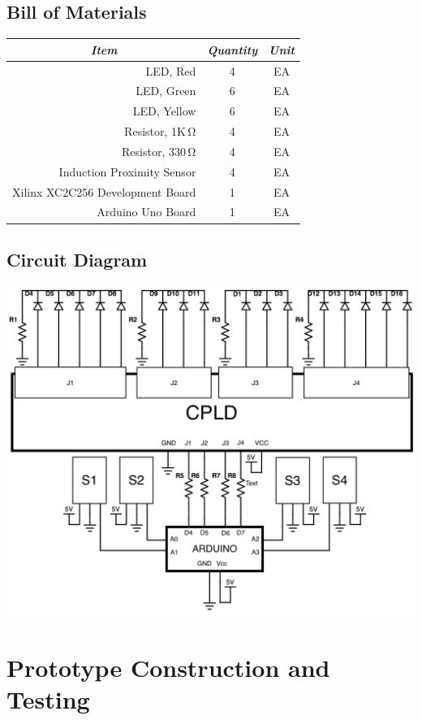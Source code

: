 \subsection{Bill of Materials}
\begin{table}[h]
\begin{tabular}{|r|c|c|}
\hline
\multicolumn{1}{|c|}{\textit{Item}} & \textit{Quantity} & \textit{Unit} \\ \hline
LED, Red & 4 & EA \\ \hline
LED, Green & 6 & EA \\ \hline
LED, Yellow & 6 & EA \\ \hline
Resistor, 1K$\,\mathrm\Omega$ & 4 & EA \\ \hline
Resistor, 330$\,\mathrm\Omega$ & 4 & EA \\ \hline
Induction Proximity Sensor & 4 & EA \\ \hline
Xilinx XC2C256 Development Board & 1 & EA \\ \hline
Arduino Uno Board & 1 & EA \\ \hline
\end{tabular}
\end{table}

\subsection{Circuit Diagram}
\includegraphics[scale=0.50]{0623151841.jpg}

\section{Prototype Construction and Testing}
